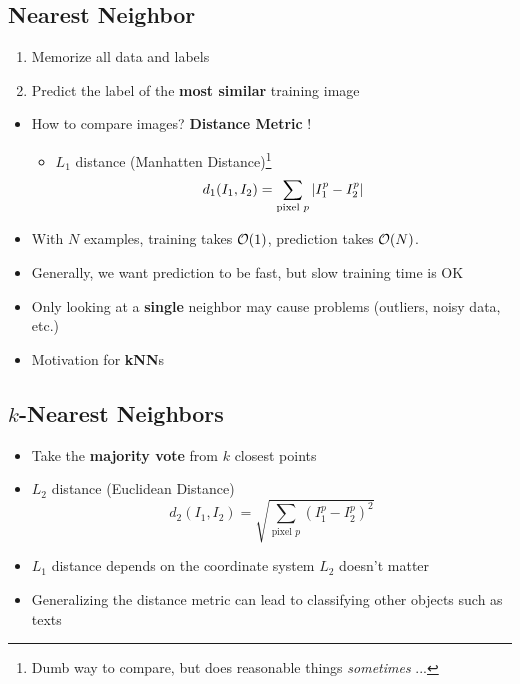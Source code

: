 \subsection{Nearest Neighbor}
\begin{enumerate}
	\item Memorize all data and labels
	\item Predict the label of the \textbf{most similar} training image
\end{enumerate}
\begin{itemize}
	\item How to compare images? \textbf{Distance Metric} !
	\begin{itemize}
		\item $L_1$ distance (Manhatten Distance)\footnote{Dumb way to compare, but does reasonable things \textit{sometimes} ...}
		$$d_1(I_1, I_2) = \sum_{\textrm{pixel } p} \left|I_1^p - I_2^p\right|$$
	\end{itemize}
	\item With $N$ examples, training takes $\mathcal{O}(1)$, prediction takes $\mathcal{O}(N)$.
	\item Generally, we want prediction to be fast, but slow training time is OK
	\item Only looking at a \textbf{single} neighbor may cause problems (outliers, noisy data, etc.)
	\item Motivation for \textbf{kNN}s
\end{itemize}

\subsection{$k$-Nearest Neighbors}
\begin{itemize}
	\item Take the \textbf{majority vote} from $k$ closest points
	\item $L_2$ distance (Euclidean Distance)
	$$d_2(I_1, I_2) = \sqrt{\sum_{\textrm{pixel } p} \left(I_1^p - I_2^p\right)^2}$$
	\item $L_1$ distance depends on the coordinate system $L_2$ doesn't matter
	\item Generalizing the distance metric can lead to classifying other objects such as texts
\end{itemize}

